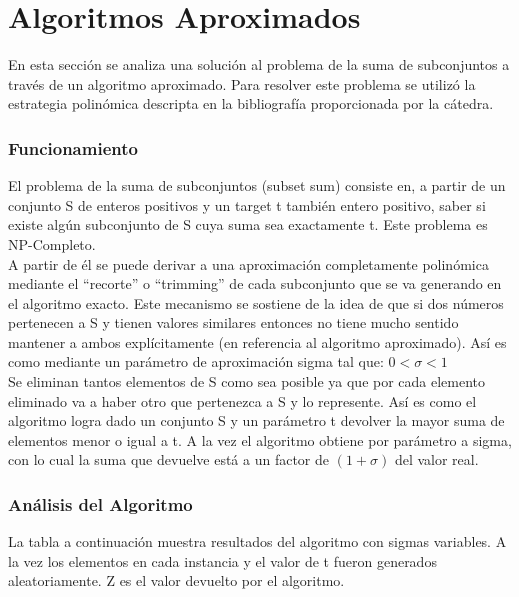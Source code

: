 \documentclass[a4paper, 10pt]{article}
\newcommand\tab[1][0.5cm]{\hspace*{#1}}
\begin{document}
    \section{Algoritmos Aproximados}
        \tab En esta sección se analiza una solución al problema de la suma de subconjuntos
        a través de un algoritmo aproximado. Para resolver este problema se utilizó la
        estrategia polinómica descripta en la bibliografía proporcionada por la cátedra.
            \subsubsection{Funcionamiento}
                \tab El problema de la suma de subconjuntos (subset sum) consiste en, a partir de un conjunto S de enteros
                positivos y un target t también entero positivo, saber si existe algún subconjunto de S cuya suma sea
                exactamente t. Este problema es NP-Completo.\\
                \tab A partir de él se puede derivar a una aproximación completamente polinómica mediante el “recorte” o
                “trimming” de cada subconjunto que se va generando en el algoritmo exacto. Este mecanismo se sostiene de
                la idea de que si dos números pertenecen a S y tienen valores similares entonces no tiene mucho sentido
                mantener a ambos explícitamente (en referencia al algoritmo aproximado). Así es como mediante un parámetro
                de aproximación sigma tal que:
                                                            $0 < \sigma < 1$ \\
                \tab Se eliminan tantos elementos de S como sea posible ya que por cada elemento eliminado va a haber otro
                que pertenezca a S y lo represente. Así es como el algoritmo logra dado un conjunto S y un parámetro t
                devolver la mayor suma de elementos menor o igual a t. A la vez el algoritmo obtiene por parámetro a sigma,
                con lo cual la suma que devuelve está a un factor de $(1 + \sigma)$ del valor real.\\
            \subsubsection{Análisis del Algoritmo}
                \tab La tabla a continuación muestra resultados del algoritmo con sigmas variables. A la vez los elementos
                en cada instancia y el valor de t fueron generados aleatoriamente. Z es el valor devuelto por el algoritmo.
\end{document}
